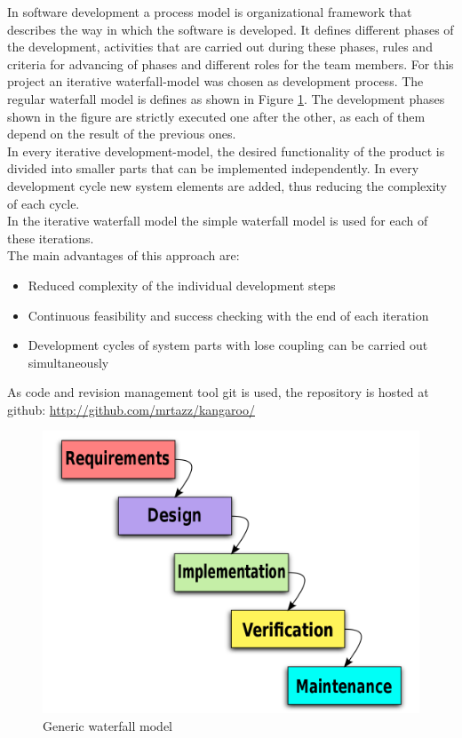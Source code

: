 In software development a process model is organizational framework that describes the way in which the software is developed. It defines different phases of the development, activities that are carried out during these phases, rules and criteria for advancing of phases and different roles for the team members. For this project an iterative waterfall-model was chosen as development process. 
The regular waterfall model is defines as shown in Figure \ref{waterfall}. The development phases shown in the figure are strictly executed one after the other, as each of them depend on the result of the previous ones. \\ In every iterative development-model, the desired functionality of the product is divided into smaller parts that can be implemented independently. In every development cycle new system elements are added, thus reducing the  complexity of each cycle.\\ In the iterative waterfall model the simple waterfall model is used for each of these iterations. \\ The main advantages of this approach are:
\begin{itemize}
\item Reduced complexity of the individual development steps
\item Continuous feasibility and success checking with the end of each iteration
\item Development cycles of system parts with lose coupling can be carried out simultaneously
\end{itemize}
As code and revision management tool git is used, the repository is hosted at github: \url{http://github.com/mrtazz/kangaroo/}
\begin{figure}[h!]
\centering
\includegraphics[width=14cm]{pics/waterfall.png}
\caption{Generic waterfall model}
\label{waterfall}
\end{figure}  


